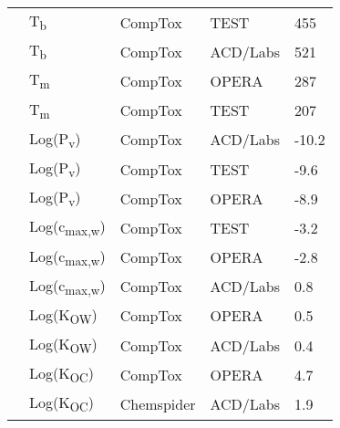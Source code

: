 \begin{landscape}
\begin{longtable}[c]{lllll}
          & T\textsubscript{b}          & CompTox    & TEST                                                                            & 455   \\
          & T\textsubscript{b}          & CompTox    & ACD/Labs                                                                        & 521   \\
          & T\textsubscript{m}          & CompTox    & OPERA                                                                           & 287   \\
          & T\textsubscript{m}          & CompTox    & TEST                                                                            & 207   \\
          & Log(P\textsubscript{v})       & CompTox    & ACD/Labs                                                                        & -10.2 \\
          & Log(P\textsubscript{v})       & CompTox    & TEST                                                                            & -9.6  \\
          & Log(P\textsubscript{v})       & CompTox    & OPERA                                                                           & -8.9  \\
          & Log(c\textsubscript{max,w}) & CompTox    & TEST                                                                            & -3.2  \\
          & Log(c\textsubscript{max,w}) & CompTox    & OPERA                                                                           & -2.8  \\
          & Log(c\textsubscript{max,w}) & CompTox    & ACD/Labs                                                                        & 0.8   \\
          & Log(K\textsubscript{OW})      & CompTox    & OPERA                                                                           & 0.5   \\
          & Log(K\textsubscript{OW})      & CompTox    & ACD/Labs                                                                        & 0.4   \\
          & Log(K\textsubscript{OC})      & CompTox    & OPERA                                                                           & 4.7   \\
          & Log(K\textsubscript{OC})      & Chemspider & ACD/Labs                                                                        & 1.9   \\

\end{longtable}
\end{landscape}
